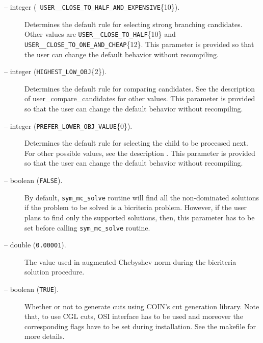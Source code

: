 \begin{description}
\item[ -- integer ({\tt
USER\_\_CLOSE\_TO\_HALF\_AND\_EXPENSIVE}\{10\}).] 
Determines the default rule for selecting strong branching candidates.
Other values are {\tt USER\_\_CLOSE\_TO\_HALF}\{10\} and 
{\tt USER\_\_CLOSE\_TO\_ONE\_AND\_CHEAP}\{12\}. This
parameter is provided so that the user can change the default behavior
without recompiling.

\item[ -- integer 
({\tt HIGHEST\_LOW\_OBJ}\{2\}).] 
Determines the default rule for comparing candidates. See the
description of 
{user_compare_candidates} for other values. This
parameter is provided so that the user can change the default behavior
without recompiling.

\item[ -- integer 
({\tt PREFER\_LOWER\_OBJ\_VALUE}\{0\}).] 
Determines the default rule for selecting the child to be processed
next. For other possible values, see the description . This
parameter is provided so that the user can change the default behavior
without recompiling.

\item[ -- boolean ({\tt FALSE}).] 
By default, {\tt sym\_mc\_solve} routine will find all the non-dominated 
solutions if the problem to be solved is 
a bicriteria problem. However, if the user plans to find only the supported 
solutions, then, this parameter has to be set before 
calling {\tt sym\_mc\_solve} routine. 

\item[ -- double ({\tt 0.00001}).] 
The value used in augmented Chebyshev norm during the bicriteria 
solution procedure.

\item[ -- boolean ({\tt TRUE}).] 
Whether or not to generate cuts using COIN's cut generation library. 
Note that, to use CGL cuts, OSI interface has to be used and moreover the 
corresponding flags have to be set during installation. See the makefile for 
more details.


\end{description}
